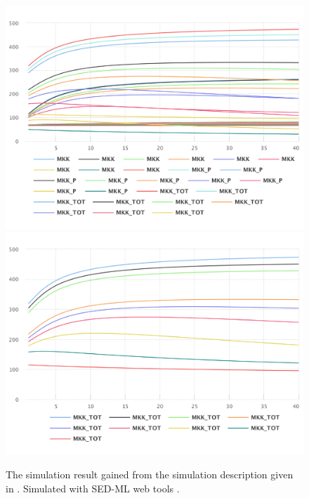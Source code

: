 \begin{figure}[ht]
    \centering
    \begin{minipage}{0.47\textwidth}
        \centering
        \includegraphics[width=1.0\textwidth]{examples/parameter-scan-2d/results/sedml_webtools/plot1}
        \includegraphics[width=1.0\textwidth]{examples/parameter-scan-2d/results/sedml_webtools/plot2}
        \caption{The simulation result gained from the simulation description given in . Simulated with SED-ML web tools \citep{bergmann2017sed}.}
    \end{minipage}\hfill
    \begin{minipage}{0.47\textwidth}
        \centering

\end{minipage}
\end{figure}
